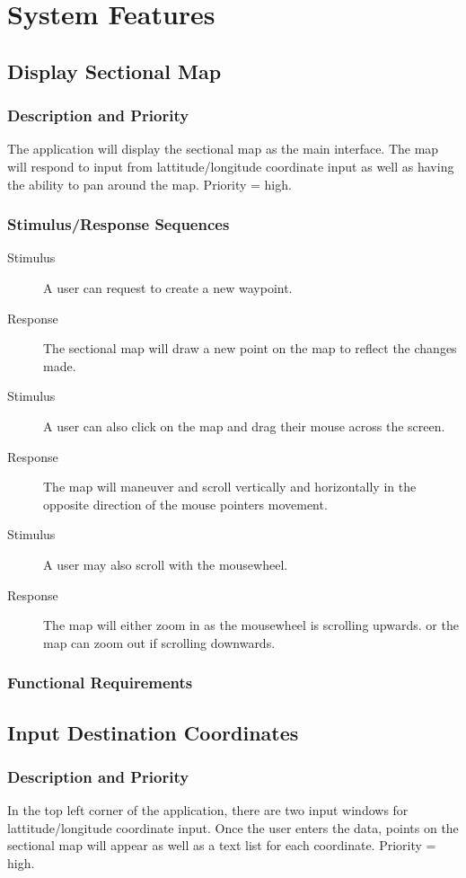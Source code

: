 \documentclass[12pt, letterpaper]{article}
\begin{document}
\section{System Features}
  \subsection{Display Sectional Map}
    \subsubsection{Description and Priority}
      The application will display the sectional map as the main interface.
      The map will respond to input from lattitude/longitude coordinate input as well
      as having the ability to pan around the map. Priority = high.
    \subsubsection{Stimulus/Response Sequences}
      \begin{description}
        \item[Stimulus] A user can request to create a new waypoint.
		\item[Response]	The sectional map will draw a new point on the map to
			reflect the changes made.
		\item[Stimulus] A user can also click on the map and drag their mouse 
			across the screen.
		\item[Response] The map will maneuver and scroll vertically and horizontally
			in the opposite direction of the mouse pointers movement.
		\item[Stimulus] A user may also scroll with the mousewheel.
		\item[Response] The map will either zoom in as the mousewheel is scrolling upwards.
			or the map can zoom out if scrolling downwards.
      \end{description}
    \subsubsection{Functional Requirements}

  \subsection{Input Destination Coordinates}
	
    \subsubsection{Description and Priority}
		In the top left corner of the application, there are two input windows for 
		lattitude/longitude coordinate input. Once the user enters the data, 
		points on the sectional map will appear as well as a text list for each 
		coordinate. Priority = high.
\end{document}
